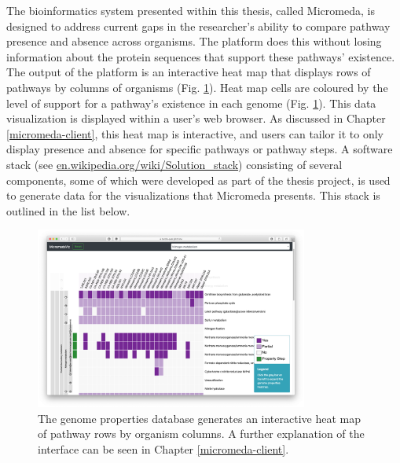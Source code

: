 The bioinformatics system presented within this thesis, called Micromeda, is designed to address current gaps in the researcher's ability to compare pathway presence and absence across organisms. The platform does this without losing information about the protein sequences that support these pathways' existence. The output of the platform is an interactive heat map that displays rows of pathways by columns of organisms (Fig. \ref{fig:basic-heatmap-overview}). Heat map cells are coloured by the level of support for a pathway's existence in each genome (Fig. \ref{fig:basic-heatmap-overview}). This data visualization is displayed within a user's web browser. As discussed in Chapter \ref{micromeda-client}, this heat map is interactive, and users can tailor it to only display presence and absence for specific pathways or pathway steps. A software stack (see \href{http://en.wikipedia.org/wiki/Solution_stack}{en.wikipedia.org/wiki/Solution\_stack}) consisting of several components, some of which were developed as part of the thesis project, is used to generate data for the visualizations that Micromeda presents. This stack is outlined in the list below.

\begin{figure}[!ht]
  \centering
	\includegraphics[width=0.8\textwidth]{media/Micromeda-Simple-Overview.png}
	 \caption{The genome properties database generates an interactive heat map of pathway rows by organism columns. A further explanation of the interface can be seen in Chapter \ref{micromeda-client}.}
	 \label{fig:basic-heatmap-overview}
\end{figure}

